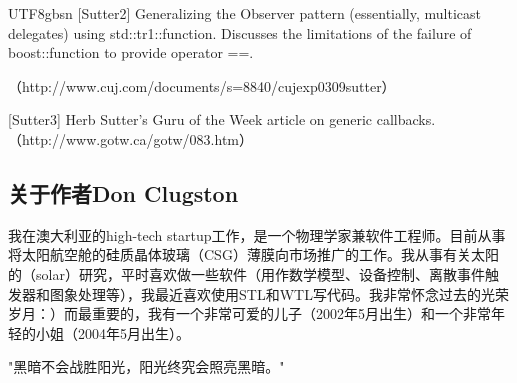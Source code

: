 \documentclass{article}
\begin{document}
\begin{CJK}{UTF8}{gbsn}
[Sutter2] Generalizing the Observer pattern (essentially, multicast delegates) using std::tr1::function. Discusses the limitations of the failure of boost::function to provide operator ==. 

（http://www.cuj.com/documents/s=8840/cujexp0309sutter）

[Sutter3] Herb Sutter's Guru of the Week article on generic callbacks. （http://www.gotw.ca/gotw/083.htm）

\subsection{关于作者Don Clugston}
我在澳大利亚的high-tech startup工作，是一个物理学家兼软件工程师。目前从事将太阳航空舱的硅质晶体玻璃（CSG）薄膜向市场推广的工作。我从事有关太阳的（solar）研究，平时喜欢做一些软件（用作数学模型、设备控制、离散事件触发器和图象处理等），我最近喜欢使用STL和WTL写代码。我非常怀念过去的光荣岁月：）而最重要的，我有一个非常可爱的儿子（2002年5月出生）和一个非常年轻的小姐（2004年5月出生）。

"黑暗不会战胜阳光，阳光终究会照亮黑暗。"

\end{CJK}
\end{document}

